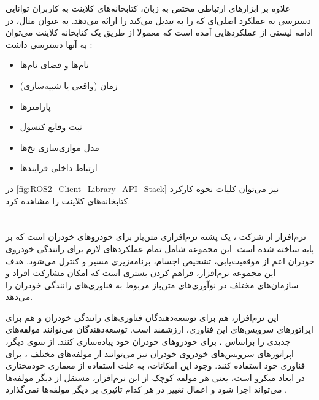 علاوه بر ابزارهای ارتباطی مختص به زبان، کتابخانه‌های کلاینت به کاربران توانایی دسترسی به عملکرد اصلی‌ای که  را به  تبدیل می‌کند را ارائه می‌دهد. به عنوان مثال، در ادامه لیستی از عملکرد‌هایی آمده است که معمولا از طریق یک  کتابخانه کلاینت می‌توان به آنها دسترسی داشت \cite{ROS2:Humble_Documentation}:
\begin{itemize}
    \item نام‌ها و فضای نام‌ها
    \item زمان (واقعی یا شبیه‌سازی)
    \item پارامترها
    \item ثبت وقایع کنسول
    \item مدل موازی‌سازی نخ‌ها
    \item ارتباط داخلی فرایند‌ها
\end{itemize}

در \cref{fig:ROS2_Client_Library_API_Stack} نیز می‌توان کلیات نحوه کارکرد کتابخانه‌های کلاینت را مشاهده کرد.

\section{}
نرم‌افزار  از شرکت ،‌ یک پشته نرم‌افزاری متن‌باز برای خودرو‌های خودران است که بر پایه  ساخته شده است. این مجموعه شامل تمام عملکردهای لازم برای رانندگی خودروی خودران اعم از موقعیت‌یابی، تشخیص اجسام، برنامه‌زیری مسیر و کنترل می‌شود. هدف این مجموعه نرم‌افزار،‌ فراهم کردن بستری است که امکان مشارکت افراد و سازمان‌های مختلف در نوآوری‌های متن‌باز مربوط به فناوری‌های رانندگی خودران را می‌دهد. 

این نرم‌افزار، هم برای توسعه‌دهندگان فناوری‌های رانندگی خودران و هم برای اپراتورهای سرویس‌های این فناوری، ارزشمند است. توسعه‌دهندگان می‌توانند مولفه‌های جدیدی را براساس ، برای خودرو‌های خودران خود پیاده‌سازی کنند. از سوی دیگر، اپراتورهای سرویس‌های خودروی خودران نیز می‌توانند از مولفه‌های مختلف ، برای فناوری خود استفاده کنند. وجود این امکانات، به علت استفاده از معماری خودمختاری در ابعاد میکرو است، یعنی هر مولفه کوچک از این نرم‌افزار، مستقل از دیگر مولفه‌ها می‌تواند اجرا شود و اعمال تغییر در هر کدام تاثیری بر دیگر مولفه‌ها نمی‌گذارد  \cite{Autoware:Documentation}. 

